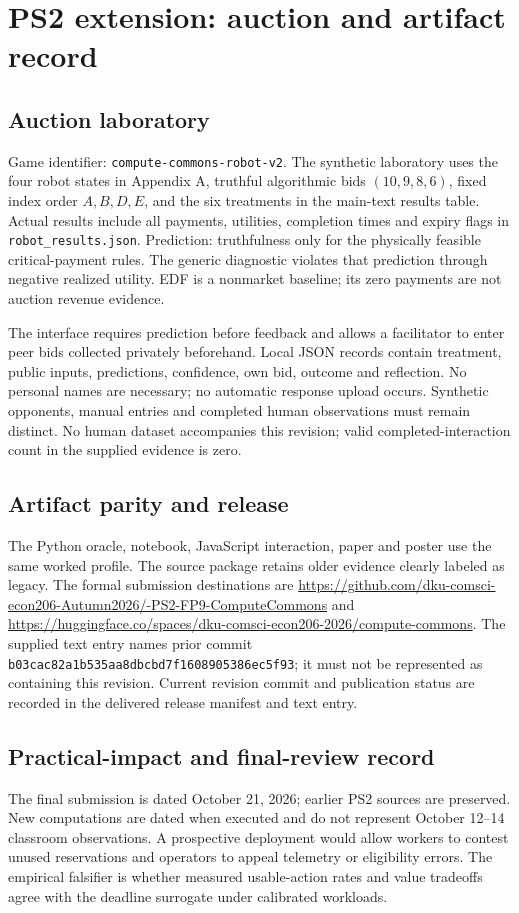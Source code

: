 \section{PS2 extension: auction and artifact record}
\subsection{Auction laboratory}
Game identifier: \texttt{compute-commons-robot-v2}. The synthetic laboratory uses the four robot states in Appendix A, truthful algorithmic bids $(10,9,8,6)$, fixed index order $A,B,D,E$, and the six treatments in the main-text results table. Actual results include all payments, utilities, completion times and expiry flags in \texttt{robot\_results.json}. Prediction: truthfulness only for the physically feasible critical-payment rules. The generic diagnostic violates that prediction through negative realized utility. EDF is a nonmarket baseline; its zero payments are not auction revenue evidence.

The interface requires prediction before feedback and allows a facilitator to enter peer bids collected privately beforehand. Local JSON records contain treatment, public inputs, predictions, confidence, own bid, outcome and reflection. No personal names are necessary; no automatic response upload occurs. Synthetic opponents, manual entries and completed human observations must remain distinct. No human dataset accompanies this revision; valid completed-interaction count in the supplied evidence is zero.

\subsection{Artifact parity and release}
The Python oracle, notebook, JavaScript interaction, paper and poster use the same worked profile. The source package retains older evidence clearly labeled as legacy. The formal submission destinations are \url{https://github.com/dku-comsci-econ206-Autumn2026/-PS2-FP9-ComputeCommons} and \url{https://huggingface.co/spaces/dku-comsci-econ206-2026/compute-commons}. The supplied text entry names prior commit \texttt{b03cac82a1b535aa8dbcbd7f1608905386ec5f93}; it must not be represented as containing this revision. Current revision commit and publication status are recorded in the delivered release manifest and text entry.

\subsection{Practical-impact and final-review record}
The final submission is dated October 21, 2026; earlier PS2 sources are preserved. New computations are dated when executed and do not represent October 12--14 classroom observations. A prospective deployment would allow workers to contest unused reservations and operators to appeal telemetry or eligibility errors. The empirical falsifier is whether measured usable-action rates and value tradeoffs agree with the deadline surrogate under calibrated workloads.

